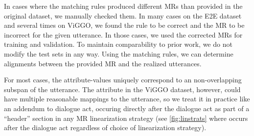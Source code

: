 In cases where the matching rules produced different MRs than provided in the
original dataset, we manually checked them. In many cases on the E2E dataset
and several times on ViGGO, we found the rule to be correct and the MR to be
incorrect for the given utterance. In those cases, we used the corrected MRs
for training and validation. To maintain comparability to prior work, we
do not modify the test sets in any way. Using the matching rules, we can
determine alignments between the provided MR and the realized utterances.

For most cases, the attribute-values uniquely correspond to an non-overlapping
subspan of the utterance. The  attribute in the ViGGO dataset,
however, could have multiple reasonable mappings to the utterance, so we treat
it in practice like an addendum to dialogue act, occuring directly after the
dialogue act as part of a ``header'' section in any  MR linearization strategy
(see \autoref{fig:linstrats} where  occurs after the dialogue
act regardless of choice of linearization strategy).
